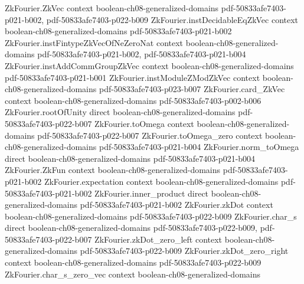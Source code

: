 \begin{lemma}
\label{ZkFourier.inner_product_char_self}
\leanok
{}
\proofstep
  {ZkFourier.ZkVec}
  {context}
  {boolean-ch08-generalized-domains}
  {pdf-50833afe7403-p021-b002,
    pdf-50833afe7403-p022-b009}
\proofstep
  {ZkFourier.instDecidableEqZkVec}
  {context}
  {boolean-ch08-generalized-domains}
  {pdf-50833afe7403-p021-b002}
\proofstep
  {ZkFourier.instFintypeZkVecOfNeZeroNat}
  {context}
  {boolean-ch08-generalized-domains}
  {pdf-50833afe7403-p021-b002,
    pdf-50833afe7403-p021-b004}
\proofstep
  {ZkFourier.instAddCommGroupZkVec}
  {context}
  {boolean-ch08-generalized-domains}
  {pdf-50833afe7403-p021-b001}
\proofstep
  {ZkFourier.instModuleZModZkVec}
  {context}
  {boolean-ch08-generalized-domains}
  {pdf-50833afe7403-p023-b007}
\proofstep
  {ZkFourier.card_ZkVec}
  {context}
  {boolean-ch08-generalized-domains}
  {pdf-50833afe7403-p002-b006}
\proofstep
  {ZkFourier.rootOfUnity}
  {direct}
  {boolean-ch08-generalized-domains}
  {pdf-50833afe7403-p022-b007}
\proofstep
  {ZkFourier.toOmega}
  {context}
  {boolean-ch08-generalized-domains}
  {pdf-50833afe7403-p022-b007}
\proofstep
  {ZkFourier.toOmega_zero}
  {context}
  {boolean-ch08-generalized-domains}
  {pdf-50833afe7403-p021-b004}
\proofstep
  {ZkFourier.norm_toOmega}
  {direct}
  {boolean-ch08-generalized-domains}
  {pdf-50833afe7403-p021-b004}
\proofstep
  {ZkFourier.ZkFun}
  {context}
  {boolean-ch08-generalized-domains}
  {pdf-50833afe7403-p021-b002}
\proofstep
  {ZkFourier.expectation}
  {context}
  {boolean-ch08-generalized-domains}
  {pdf-50833afe7403-p021-b002}
\proofstep
  {ZkFourier.inner_product}
  {direct}
  {boolean-ch08-generalized-domains}
  {pdf-50833afe7403-p021-b002}
\proofstep
  {ZkFourier.zkDot}
  {context}
  {boolean-ch08-generalized-domains}
  {pdf-50833afe7403-p022-b009}
\proofstep
  {ZkFourier.char_s}
  {direct}
  {boolean-ch08-generalized-domains}
  {pdf-50833afe7403-p022-b009,
    pdf-50833afe7403-p022-b007}
\proofstep
  {ZkFourier.zkDot_zero_left}
  {context}
  {boolean-ch08-generalized-domains}
  {pdf-50833afe7403-p022-b009}
\proofstep
  {ZkFourier.zkDot_zero_right}
  {context}
  {boolean-ch08-generalized-domains}
  {pdf-50833afe7403-p022-b009}
\proofstep
  {ZkFourier.char_s_zero_vec}
  {context}
  {boolean-ch08-generalized-domains}

\end{lemma}
